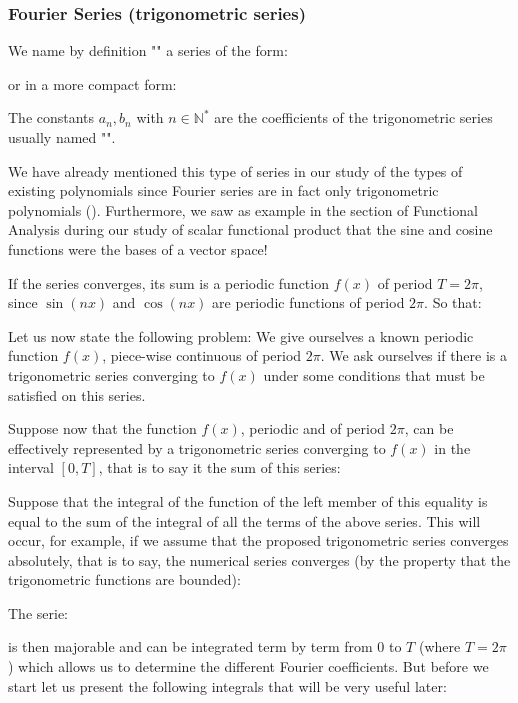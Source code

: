 	\subsubsection{Fourier Series (trigonometric series)}
	We name by definition "" a series of the form:
	
	or in a more compact form:
	
	The constants $a_n,b_n$ with $n\in \mathbb{N}^{*}$ are the coefficients of the trigonometric series usually named "".
	
	\begin{tcolorbox}[title=Remark,colframe=black,arc=10pt]
	We have already mentioned this type of series in our study of the types of existing polynomials since Fourier series are in fact only trigonometric polynomials (). Furthermore, we saw as example in the section of Functional Analysis during our study of scalar functional product that the sine and cosine functions were the bases of a vector space!
	\end{tcolorbox}
	If the series converges, its sum is a periodic function $f (x)$ of period $T=2\pi$, since $\sin (nx)$ and $\cos (nx)$ are periodic functions of period $2\pi$. So that:
	
	Let us now state the following problem: We give ourselves a known periodic function $f(x)$, piece-wise continuous of period $2\pi$. We ask ourselves if there is a trigonometric series converging to $f (x)$ under some conditions that must be satisfied on this series.
	
	Suppose now that the function $f (x)$, periodic and of period $2\pi$, can be effectively represented by a trigonometric series converging to $f (x)$ in the interval $[0, T]$, that is to say it the sum of this series:
	
	Suppose that the integral of the function of the left member of this equality is equal to the sum of the integral of all the terms of the above series. This will occur, for example, if we assume that the proposed trigonometric series converges absolutely, that is to say, the numerical series converges (by the property that the trigonometric functions are bounded):
	
	The serie:
	
	is then majorable and can be integrated term by term from $0$ to $T$ (where $T=2\pi$) which allows us to determine the different Fourier coefficients. But before we start let us present the following integrals that will be very useful later:
	

